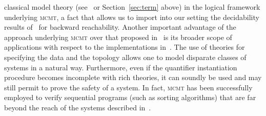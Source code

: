 \documentclass{LMCS}
\theoremstyle{plain}\newtheorem{assumption}[thm]{Assumption}
\theoremstyle{plain}\newtheorem{proposition}[thm]{Proposition}
\theoremstyle{plain}\newtheorem{property}[thm]{Property}
\theoremstyle{plain}\newtheorem{example}[thm]{Example}
\theoremstyle{plain}\newtheorem{claim}[thm]{Claim}
\theoremstyle{plain}\newtheorem{lemma}[thm]{Lemma}
\begin{document}
classical model theory (see~\cite{ijcar08}  or Section~\ref{sec:term} above) in the logical framework
underlying \textsc{mcmt}, a fact that allows us to import into our
setting the decidability results of~\cite{lics} for backward
reachability.  Another important advantage of the approach underlying
\textsc{mcmt} over that proposed in~\cite{lics} is its broader scope
of applications with respect to the implementations
in~\cite{tacas06,cav06,vmcai08}.  The use of theories for specifying
the data and the topology allows one to model disparate classes of
systems in a natural way.  Furthermore, even if the quantifier
instantiation procedure becomes incomplete with rich theories, it can
soundly be used and may still permit to prove the safety of a system.
In fact, \textsc{mcmt} has been successfully employed to verify
sequential programs (such as sorting
algorithms) that are far beyond the reach of the systems described
in~\cite{tacas06,cav06}.
\end{document}
